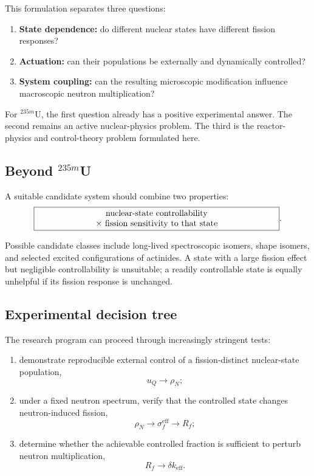 This formulation separates three questions:
\begin{enumerate}
\item \textbf{State dependence:} do different nuclear states have different fission responses?
\item \textbf{Actuation:} can their populations be externally and dynamically controlled?
\item \textbf{System coupling:} can the resulting microscopic modification influence macroscopic neutron multiplication?
\end{enumerate}

For $^{235m}$U, the first question already has a positive experimental answer. The second remains an active nuclear-physics problem. The third is the reactor-physics and control-theory problem formulated here.

\subsection{Beyond \texorpdfstring{$^{235m}$U}{235mU}}

A suitable candidate system should combine two properties:
\begin{equation}
\boxed{
\begin{minipage}{0.82\columnwidth}
\centering
nuclear-state controllability\\
$\times$ fission sensitivity to that state
\end{minipage}
}.
\end{equation}

Possible candidate classes include long-lived spectroscopic isomers, shape isomers, and selected excited configurations of actinides. A state with a large fission effect but negligible controllability is unsuitable; a readily controllable state is equally unhelpful if its fission response is unchanged.

\subsection{Experimental decision tree}

The research program can proceed through increasingly stringent tests:
\begin{enumerate}
\item demonstrate reproducible external control of a fission-distinct nuclear-state population,
\begin{equation}
u_Q\rightarrow\rho_N;
\end{equation}
\item under a fixed neutron spectrum, verify that the controlled state changes neutron-induced fission,
\begin{equation}
\rho_N
\rightarrow
\sigma_f^{\mathrm{eff}}
\rightarrow
R_f;
\end{equation}
\item determine whether the achievable controlled fraction is sufficient to perturb neutron multiplication,
\begin{equation}
R_f
\rightarrow
\delta k_{\mathrm{eff}}.
\end{equation}
\end{enumerate}

